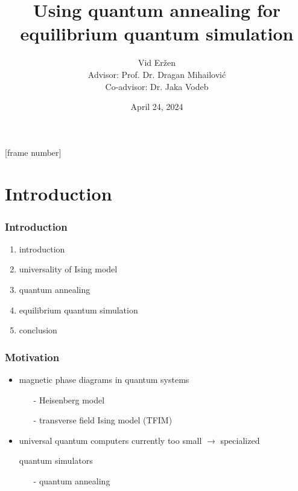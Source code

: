 \documentclass[11pt]{beamer}
\title{Using quantum annealing for equilibrium quantum simulation}
\author{Vid Eržen\\Advisor: Prof. Dr. Dragan Mihailović\\Co-advisor: Dr. Jaka Vodeb}
\date{April 24, 2024}
\newcommand{\itemb}{\item[$\bullet$]}
\begin{document}
\begingroup
    \begin{frame}
        \titlepage
    \end{frame}
\endgroup

[frame number]

\section{Introduction}
\begin{frame}
    \frametitle{Introduction}
    \begin{enumerate}
        \setlength{\itemindent}{-1em}
        \item introduction
        \item universality of Ising model
        \item quantum annealing
        \item equilibrium quantum simulation
        \item conclusion
    \end{enumerate}
\end{frame}

\begin{frame}
    \frametitle{Motivation}
    \begin{itemize}
        \setlength{\itemindent}{-1em}
        \itemb magnetic phase diagrams in quantum systems
        \begin{itemize}
            \setlength{\itemindent}{-1em}
            \item [-] Heisenberg model
            \item [-] transverse field Ising model (TFIM)
        \end{itemize}
        \itemb universal quantum computers currently too small $\to$ specialized
        \item [] quantum simulators
        \begin{itemize}
            \setlength{\itemindent}{-1em}
            \item [-] quantum annealing
        \end{itemize}
    \end{itemize}
\end{frame}
\end{document}

